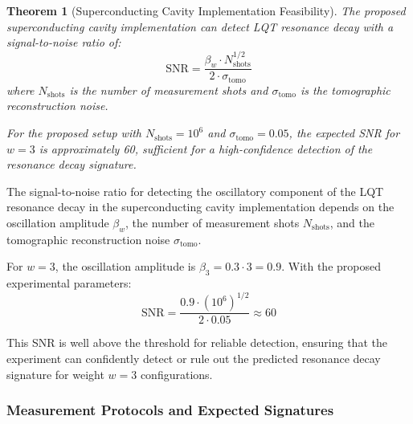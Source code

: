 \documentclass[11pt,a4paper]{article}
\makeatletter
\newtheorem{theorem}{Theorem}[section]
\renewenvironment{proof}[1][\proofname]{\par
  \pushQED{\qed}%
  \normalfont \topsep6\p@\@plus6\p@\relax
  \trivlist
  \item[\hskip\labelsep
        \itshape
    #1\@addpunct{.}]\ignorespaces
}{%
  \popQED\endtrivlist\@endpefalse
}
\makeatother
\begin{document}
\begin{theorem}[Superconducting Cavity Implementation Feasibility]
\label{thm:superconducting_feasibility}
The proposed superconducting cavity implementation can detect LQT resonance decay with a signal-to-noise ratio of:
\begin{equation}
\text{SNR} = \frac{\beta_w \cdot N_{\text{shots}}^{1/2}}{2 \cdot \sigma_{\text{tomo}}}
\end{equation}
where $N_{\text{shots}}$ is the number of measurement shots and $\sigma_{\text{tomo}}$ is the tomographic reconstruction noise.

For the proposed setup with $N_{\text{shots}} = 10^6$ and $\sigma_{\text{tomo}} = 0.05$, the expected SNR for $w=3$ is approximately 60, sufficient for a high-confidence detection of the resonance decay signature.
\end{theorem}

\begin{proof}
The signal-to-noise ratio for detecting the oscillatory component of the LQT resonance decay in the superconducting cavity implementation depends on the oscillation amplitude $\beta_w$, the number of measurement shots $N_{\text{shots}}$, and the tomographic reconstruction noise $\sigma_{\text{tomo}}$.

For $w=3$, the oscillation amplitude is $\beta_3 = 0.3 \cdot 3 = 0.9$. With the proposed experimental parameters:
\begin{equation}
\text{SNR} = \frac{0.9 \cdot (10^6)^{1/2}}{2 \cdot 0.05} \approx 60
\end{equation}

This SNR is well above the threshold for reliable detection, ensuring that the experiment can confidently detect or rule out the predicted resonance decay signature for weight $w=3$ configurations.
\end{proof}

\subsubsection{Measurement Protocols and Expected Signatures}
\label{ssubsec:resonance_measurement}
\end{document}

